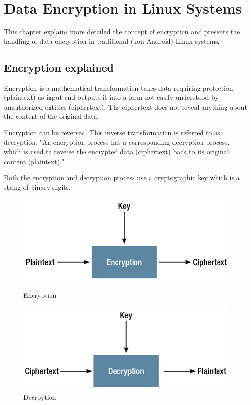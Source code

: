 \chapter{Data Encryption in Linux Systems}
\label{chapter:enc-linux}

This chapter explains more detailed the concept of encryption and presents the handling of data encryption in traditional (non-Android) Linux systems.

\section{Encryption explained}
\label{sec:enc-explained}

Encryption is a mathematical transformation takes data requiring protection (plaintext) as input and outputs it into a form not easily understood by unauthorized entities (ciphertext). The ciphertext does not reveal anything about the content of the original data.

Encryption can be reversed. This inverse transformation is referred to as decryption. "An encryption process has a corresponding decryption process, which is used to reverse the encrypted data (ciphertext) back to its original content (plaintext)\cite{enc-basics}."

Both the encryption and decryption process use a cryptographic key which is a string of binary digits.

\begin{figure}[h]
\centering
\begin{minipage}{0.45\textwidth}
\centering
  \includegraphics[width=.9\linewidth]{src/img/encrypt/plain2cipher.jpg}
  \caption{Encryption\cite{enc-basics}}
  \label{fig:encrypt-fig}
\end{minipage}\hfill
\begin{minipage}{0.45\textwidth}
\centering
  \includegraphics[width=.9\linewidth]{src/img/encrypt/cipher2plain.jpg}
  \caption{Decrpytion\cite{enc-basics}}
  \label{fig:decrypt-fig}
\end{minipage}
\end{figure}

